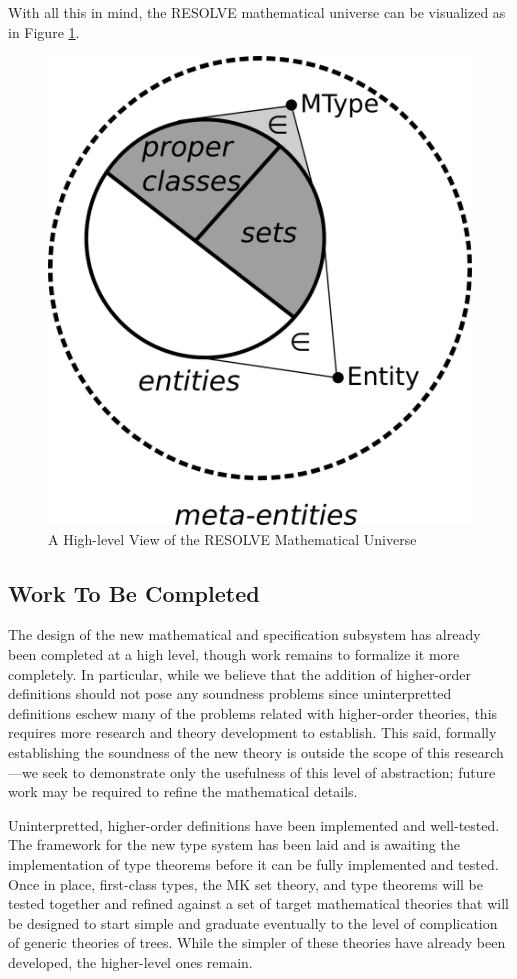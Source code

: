 With all this in mind, the RESOLVE mathematical universe can be visualized as in Figure \ref{fig:universe}.

\begin{figure}
  \centering
    \includegraphics[width=.33\textwidth]{universe}
  \caption{A High-level View of the RESOLVE Mathematical Universe\label{fig:universe}}
\end{figure}

\subsection{Work To Be Completed}
The design of the new mathematical and specification subsystem has already been completed at a high level, though work remains to formalize it more completely. In particular, while we believe that the addition of higher-order definitions should not pose any soundness problems since uninterpretted definitions eschew many of the problems related with higher-order theories, this requires more research and theory development to establish.  This said, formally establishing the soundness of the new theory is outside the scope of this research---we seek to demonstrate only the usefulness of this level of abstraction; future work may be required to refine the mathematical details.

Uninterpretted, higher-order definitions have been implemented and well-tested.  The framework for the new type system has been laid and is awaiting the implementation of type theorems before it can be fully implemented and tested.  Once in place, first-class types, the MK set theory, and type theorems will be tested together and refined against a set of target mathematical theories that will be designed to start simple and graduate eventually to the level of complication of generic theories of trees.  While the simpler of these theories have already been developed, the higher-level ones remain.

